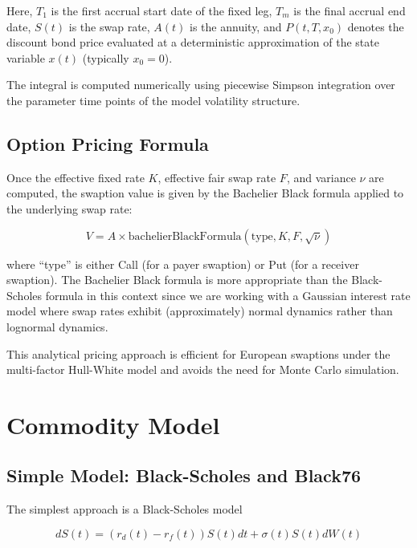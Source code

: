 \documentclass{amsart}
\theoremstyle{plain}
\numberwithin{equation}{section}
\begin{document}
Here, $T_1$ is the first accrual start date of the fixed leg, $T_m$ is the final accrual end date, $S(t)$ is the swap
rate, $A(t)$ is the annuity, and $P(t,T,x_0)$ denotes the discount bond price evaluated at a deterministic
approximation of the state variable $x(t)$ (typically $x_0 = 0$).

The integral is computed numerically using piecewise Simpson integration over the parameter time points of the model
volatility structure.

\subsection{Option Pricing Formula}

Once the effective fixed rate $K$, effective fair swap rate $F$, and variance $\nu$ are computed, the swaption value is
given by the Bachelier Black formula applied to the underlying swap rate:

\begin{equation}\label{swaption_price}
V = A \times \text{bachelierBlackFormula}(\text{type}, K, F, \sqrt{\nu})
\end{equation}

where ``type'' is either Call (for a payer swaption) or Put (for a receiver swaption). The Bachelier Black formula is
more appropriate than the Black-Scholes formula in this context since we are working with a Gaussian interest rate model
where swap rates exhibit (approximately) normal dynamics rather than lognormal dynamics.

This analytical pricing approach is efficient for European swaptions under the multi-factor Hull-White model and avoids
the need for Monte Carlo simulation.

\section{Commodity Model}\label{sec:commodity_model}

\subsection{Simple Model: Black-Scholes and Black76}

The simplest approach is a Black-Scholes model

\begin{equation}
dS(t) = (r_d(t) - r_f(t)) S(t) dt + \sigma(t) S(t) dW(t)
\end{equation}
\end{document}
